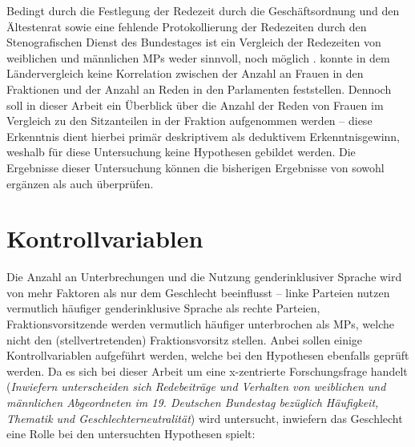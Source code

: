 \documentclass[12pt, 
    twoside=false, 
    bibliography=totoc, 
    numbers=endperiod, 
    headings=normal, 
    toc=chapterentrydotfill
    ]{scrbook}
\begin{document}
Bedingt durch die Festlegung der Redezeit durch die Geschäftsordnung und den Ältestenrat sowie eine fehlende Protokollierung der Redezeiten durch den Stenografischen Dienst des Bundestages ist ein Vergleich der Redezeiten von weiblichen und männlichen MPs weder sinnvoll, noch möglich .
\textcite{back_2018} konnte in dem Ländervergleich keine Korrelation zwischen der Anzahl an Frauen in den Fraktionen und der Anzahl an Reden in den Parlamenten feststellen. Dennoch soll in dieser Arbeit ein Überblick über die Anzahl der Reden von Frauen im Vergleich zu den Sitzanteilen in der Fraktion aufgenommen werden -- diese Erkenntnis dient hierbei primär deskriptivem als deduktivem Erkenntnisgewinn, weshalb für diese Untersuchung keine Hypothesen gebildet werden. Die Ergebnisse dieser Untersuchung können die bisherigen Ergebnisse von \textcite{back_2018} sowohl ergänzen als auch überprüfen.


\section{Kontrollvariablen}

Die Anzahl an Unterbrechungen und die Nutzung genderinklusiver Sprache wird von mehr Faktoren als nur dem Geschlecht beeinflusst -- linke Parteien nutzen vermutlich häufiger genderinklusive Sprache als rechte Parteien, Fraktionsvorsitzende werden vermutlich häufiger unterbrochen als MPs, welche nicht den (stellvertretenden) Fraktionsvorsitz stellen.
Anbei sollen einige Kontrollvariablen aufgeführt werden, welche bei den Hypothesen ebenfalls geprüft werden. Da es sich bei dieser Arbeit um eine x-zentrierte Forschungsfrage handelt (\emph{Inwiefern unterscheiden sich Redebeiträge und Verhalten von weiblichen und männlichen Abgeordneten im 19. Deutschen Bundestag bezüglich Häufigkeit, Thematik und Geschlechterneutralität}) \parencite[vgl.][4f.]{ganghof_2005} wird untersucht, inwiefern das Geschlecht eine Rolle bei den untersuchten Hypothesen spielt: 
\end{document}
